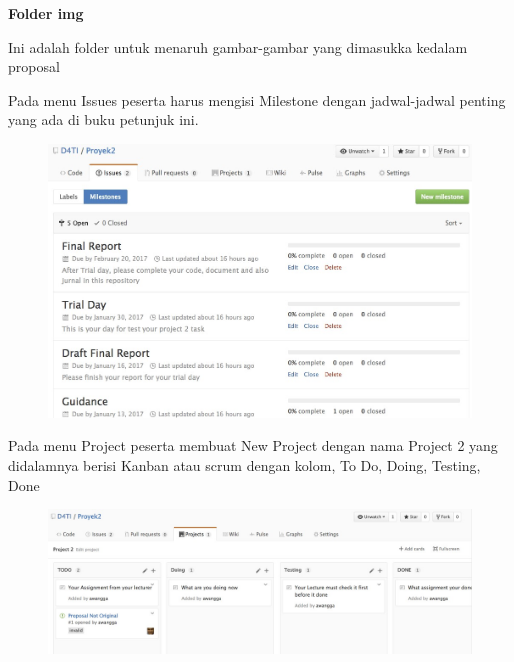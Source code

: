 \textbf{Folder	img} \par 
Ini	adalah	folder	untuk	menaruh	gambar-gambar	yang	dimasukka	kedalam	proposal \par 

Pada	menu	Issues	peserta harus	mengisi	Milestone	dengan	jadwal-jadwal	penting	yang	ada	di	buku	petunjuk	ini.

\begin{figure}[H]
    \centering
    \includegraphics[scale=0.5]{figures/22.jpg}
    \label{22}
\end{figure}

Pada	menu	Project	peserta	membuat	New	Project	dengan	nama	Project	2	yang	didalamnya	berisi	Kanban	atau	scrum	dengan	kolom,	To	Do,	Doing,	Testing,	Done


\begin{figure}[H]
    \centering
    \includegraphics[scale=0.5]{figures/33.jpg}
    \label{33}
\end{figure}


